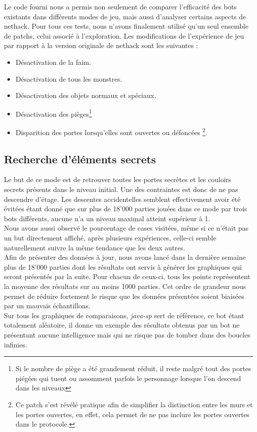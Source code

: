 \documentclass[a4paper,12pt]{article}
\begin{document}
Le code fourni nous a permis non seulement de comparer l'efficacité des bots
existants dans différents modes de jeu, mais aussi d'analyser certains aspects
de nethack. Pour tous ces tests, nous n'avons finalement utilisé qu'un seul
ensemble de patchs, celui associé à l'exploration. Les modifications de
l'expérience de jeu par rapport à la version originale de nethack sont les
suivantes :
\begin{itemize}
\item Désactivation de la faim.
\item Désactivation de tous les monstres.
\item Désactivation des objets normaux et spéciaux.
\item Désactivation des pièges\footnote{Si le nombre de piège a été grandement
  réduit, il reste malgré tout des portes piégées qui tuent ou assomment parfois
  le personnage lorsque l'on descend dans les niveaux}
\item Disparition des portes lorsqu'elles sont ouvertes ou défoncées
  \footnote{Ce patch s'est révélé pratique afin de simplifier la distinction
    entre les murs et les portes ouvertes, en effet, cela permet de ne pas
    inclure les portes ouvertes dans le protocole.}.
\end{itemize}

\subsection{Recherche d'éléments secrets}
Le but de ce mode est de retrouver toutes les portes secrètes et les couloirs
secrets présents dans le niveau initial. Une des contraintes est donc de ne pas
descendre d'étage. Les descentes accidentelles semblent effectivement avoir été
évitées étant donné que sur plus de 18'000 parties jouées dans ce mode par trois
bots différents, aucune n'a un niveau maximal atteint supérieur à 1.
\\
Nous avons aussi observé le pourcentage de cases visitées, même si ce n'était
pas un but directement affiché, après plusieurs expériences, celle-ci semble
naturellement suivre la même tendance que les deux autres.
\\
Afin de présenter des données à jour, nous avons lancé dans la dernière semaine
plus de 18'000 parties dont les résultats ont servis à générer les graphiques
qui seront présentés par la suite. Pour chacun de ceux-ci, tous les points
représentent la moyenne des résultats sur au moins 1000 parties. Cet ordre de
grandeur nous permet de réduire fortement le risque que les données présentées
soient biaisées par un mauvais échantillons.
\\
Sur tous les graphiques de comparaisons, {\em java-sp} sert de référence, ce bot
étant totalement aléatoire, il donne un exemple des résultats obtenus par un bot
ne présentant aucune intelligence mais qui ne risque pas de tomber dans des
boucles infinies.
\end{document}
